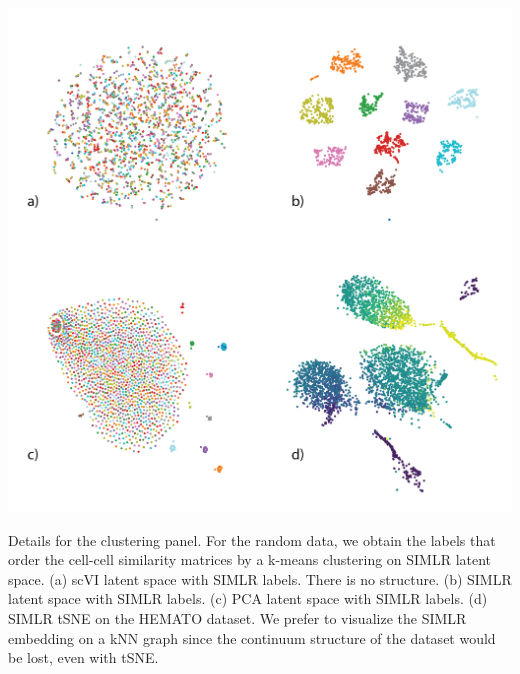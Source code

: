 \begin{suppfigure}
\centering
\includegraphics[width=\textwidth]{figures/SIMLR_supplement.png}
\caption[Details for the clustering panel]{Details for the clustering panel. For the random data, we obtain the labels that order the cell-cell similarity matrices by a k-means clustering on SIMLR latent space. (a) scVI latent space with SIMLR labels. There is no structure. (b) SIMLR latent space with SIMLR labels. (c) PCA latent space with SIMLR labels. (d) SIMLR tSNE on the HEMATO dataset. We prefer to visualize the SIMLR embedding on a kNN graph since the continuum structure of the dataset would be lost, even with tSNE.}
\label{scvisuppfig2}
\end{suppfigure}


